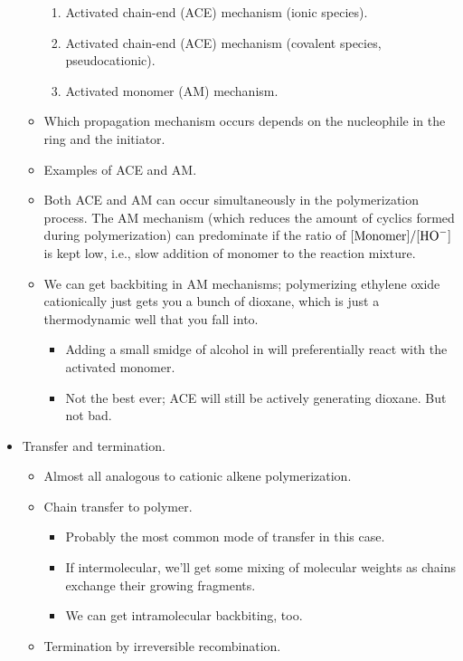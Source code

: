 \documentclass[../notes.tex]{subfiles}
\begin{document}
\begin{itemize}
\begin{itemize}
        \begin{enumerate}
            \item Activated chain-end (ACE) mechanism (ionic species).
            \item Activated chain-end (ACE) mechanism (covalent species, pseudocationic).
            \item Activated monomer (AM) mechanism.
        \end{enumerate}
        \item Which propagation mechanism occurs depends on the nucleophile in the ring and the initiator.
        \item Examples of ACE and AM.
        \item Both ACE and AM can occur simultaneously in the polymerization process. The AM mechanism (which reduces the amount of cyclics formed during polymerization) can predominate if the ratio of $[\text{Monomer}]/[\ce{HO-}]$ is kept low, i.e., slow addition of monomer to the reaction mixture.
        \item We can get backbiting in AM mechanisms; polymerizing ethylene oxide cationically just gets you a bunch of dioxane, which is just a thermodynamic well that you fall into.
        \begin{itemize}
            \item Adding a small smidge of alcohol in will preferentially react with the activated monomer.
            \item Not the best ever; ACE will still be actively generating dioxane. But not bad.
        \end{itemize}
    \end{itemize}
    \item Transfer and termination.
    \begin{itemize}
        \item Almost all analogous to cationic alkene polymerization.
        \item Chain transfer to polymer.
        \begin{itemize}
            \item Probably the most common mode of transfer in this case.
            \item If intermolecular, we'll get some mixing of molecular weights as chains exchange their growing fragments.
            \item We can get intramolecular backbiting, too.
        \end{itemize}
        \item Termination by irreversible recombination.

\end{itemize}
\end{itemize}
\end{document}
